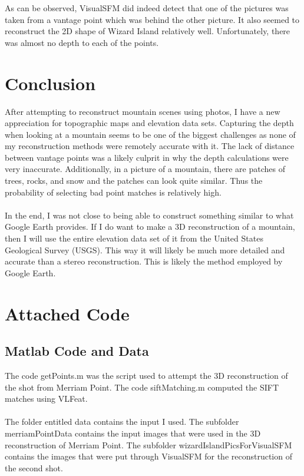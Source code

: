 \documentclass[11pt,psfig]{article}
\begin{document}
\newpage 

As can be observed, VisualSFM did indeed detect that one of the pictures was taken from a vantage point which was behind the other picture. It also seemed to reconstruct the 2D shape of Wizard Island relatively well. Unfortunately, there was almost no depth to each of the points. 

\newpage

\section{Conclusion}

After attempting to reconstruct mountain scenes using photos, I have a new appreciation for topographic maps and elevation data sets. Capturing the depth when looking at a mountain seems to be one of the biggest challenges as none of my reconstruction methods were remotely accurate with it. The lack of distance between vantage points was a likely culprit in why the depth calculations were very inaccurate. Additionally, in a picture of a mountain, there are patches of trees, rocks, and snow and the patches can look quite similar. Thus the probability of selecting bad point matches is relatively high. \\
\\
In the end, I was not close to being able to construct something similar to what Google Earth provides. If I do want to make a 3D reconstruction of a mountain, then I will use the entire elevation data set of it from the United States Geological Survey (USGS). This way it will likely be much more detailed and accurate than a stereo reconstruction. This is likely the method employed by Google Earth. 

\section{Attached Code}

\subsection{Matlab Code and Data}

The code getPoints.m was the script used to attempt the 3D reconstruction of the shot from Merriam Point. The code siftMatching.m computed the SIFT matches using VLFeat. \\
\\
The folder entitled data contains the input I used. The subfolder merriamPointData contains the input images that were used in the 3D reconstruction of Merriam Point. The subfolder wizardIslandPicsForVisualSFM contains the images that were put through VisualSFM for the reconstruction of the second shot. 
\end{document}
